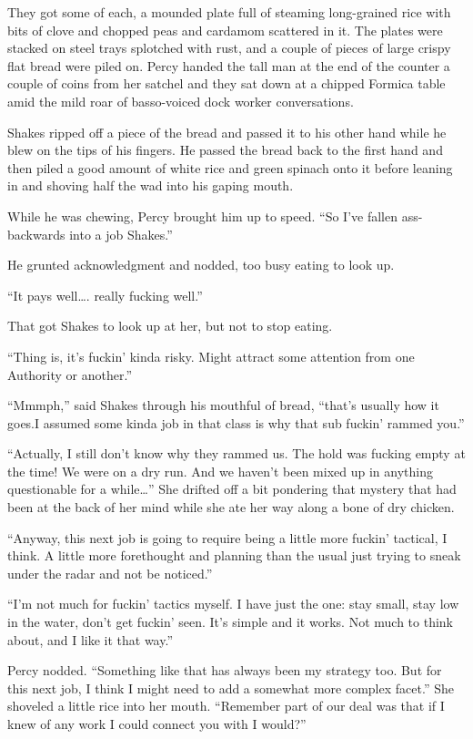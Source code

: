 \documentclass[
]{scrbook}
\begin{document}
They got some of each, a mounded plate full of steaming long-grained
rice with bits of clove and chopped peas and cardamom scattered in it.
The plates were stacked on steel trays splotched with rust, and a couple
of pieces of large crispy flat bread were piled on. Percy handed the
tall man at the end of the counter a couple of coins from her satchel
and they sat down at a chipped Formica table amid the mild roar of
basso-voiced dock worker conversations.

Shakes ripped off a piece of the bread and passed it to his other hand
while he blew on the tips of his fingers. He passed the bread back to
the first hand and then piled a good amount of white rice and green
spinach onto it before leaning in and shoving half the wad into his
gaping mouth.

While he was chewing, Percy brought him up to speed. ``So I've fallen
ass-backwards into a job Shakes.''

He grunted acknowledgment and nodded, too busy eating to look up.

``It pays well\ldots. really fucking well.''

That got Shakes to look up at her, but not to stop eating.

``Thing is, it's fuckin' kinda risky. Might attract some attention from
one Authority or another.''

``Mmmph,'' said Shakes through his mouthful of bread, ``that's usually
how it goes.I assumed some kinda job in that class is why that sub
fuckin' rammed you.''

``Actually, I still don't know why they rammed us. The hold was fucking
empty at the time! We were on a dry run. And we haven't been mixed up in
anything questionable for a while\ldots{}'' She drifted off a bit
pondering that mystery that had been at the back of her mind while she
ate her way along a bone of dry chicken.

``Anyway, this next job is going to require being a little more fuckin'
tactical, I think. A little more forethought and planning than the usual
just trying to sneak under the radar and not be noticed.''

``I'm not much for fuckin' tactics myself. I have just the one: stay
small, stay low in the water, don't get fuckin' seen. It's simple and it
works. Not much to think about, and I like it that way.''

Percy nodded. ``Something like that has always been my strategy too. But
for this next job, I think I might need to add a somewhat more complex
facet.'' She shoveled a little rice into her mouth. ``Remember part of
our deal was that if I knew of any work I could connect you with I
would?''
\end{document}

